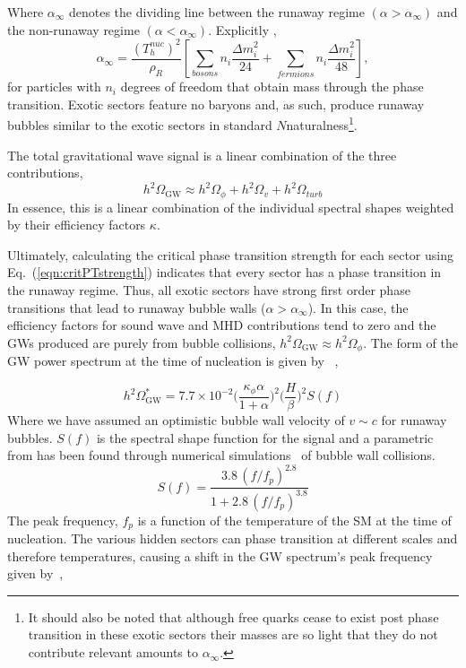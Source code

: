 \documentclass[nofootinbib,twocolumn,preprintnumbers]{revtex4-1}
\begin{document}
Where $\alpha_{\infty}$ denotes the dividing line between the runaway regime  $(\alpha >\alpha_{\infty})$ and the non-runaway regime $(\alpha <\alpha_{\infty})$. Explicitly \cite{Breitbach:2018ddu, Caprini:2015zlo, Espinosa:2010hh}, 
\begin{equation}\label{eqn:critPTstrength}
\alpha_{\infty} = \frac{(T^{nuc}_h)^2}{\rho_R}\left[\sum_{bosons} n_i\frac{\Delta m^2_i}{24} + \sum_{fermions} n_i\frac{\Delta m_i^2}{48}\right],
\end{equation} 
for particles with $n_i$ degrees of freedom that obtain mass through the phase transition. 
Exotic sectors feature no baryons and, as such, produce runaway bubbles similar to the exotic sectors in standard $N$naturalness\footnote {It should also be noted that although free quarks cease to exist post phase transition in these exotic sectors their masses are so light that they do not contribute relevant amounts to $\alpha_{\infty}$.}. 

The total gravitational wave signal is a linear combination of the three contributions,
\begin{equation}
h^2\Omega_{\textrm{GW}} \approx h^2\Omega_{\phi} + h^2\Omega_{v} + h^2\Omega_{turb} 
\end{equation}
In essence, this is a linear combination of the individual spectral shapes weighted by their efficiency factors $\kappa$. 


Ultimately, calculating the critical phase transition strength for each sector using Eq.~(\ref{eqn:critPTstrength}) indicates that every sector has a phase transition in the runaway regime. Thus, all exotic sectors have strong first order phase transitions that lead to runaway bubble walls ($\alpha >\alpha_{\infty}$). In this case, the efficiency factors for sound wave and MHD contributions tend to zero and the GWs produced are purely from bubble collisions, $h^2\Omega_{\textrm{GW}} \approx h^2\Omega_{\phi}$.  The form of the GW power spectrum at the time of nucleation is given by ~\citep{Breitbach:2018ddu},

\begin{equation}
h^2\Omega_{\textrm{GW}}^* = 7.7\times 10^{-2} \bigg( \frac{\kappa_{\phi} \alpha}{1 + \alpha} \bigg)^2 \bigg( \frac{H}{\beta} \bigg)^2  S(f)
\end{equation}
Where we have assumed an optimistic bubble wall velocity of $v \sim c$ for runaway bubbles. $S(f)$ is the spectral shape function for the signal and a parametric from has been found through numerical simulations~\cite{} of bubble wall collisions.
\begin{equation}\label{eqn::spectralshape}
S(f) = \frac{3.8 \,(f/f_p)^{2.8}}{1 + 2.8\,(f/f_p)^{3.8}}
\end{equation}
The peak frequency, $f_{p}$ is a function of the temperature of the SM at the time of nucleation.  The various hidden sectors can phase transition at different scales and therefore temperatures, causing a shift in the GW spectrum's peak frequency given by~\cite{},
\end{document}
